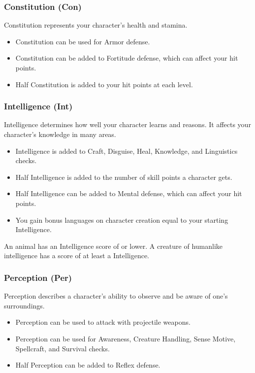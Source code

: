 \subsubsection{Constitution (Con)}\label{Constitution}
Constitution represents your character's health and stamina.
\begin{itemize}
    \item Constitution can be used for Armor defense.
    \item Constitution can be added to Fortitude defense, which can affect your hit points.
    \item Half Constitution is added to your hit points at each level.
\end{itemize}

\subsubsection{Intelligence (Int)}\label{Intelligence}
Intelligence determines how well your character learns and reasons.
It affects your character's knowledge in many areas.

\begin{itemize}
    \item Intelligence is added to Craft, Disguise, Heal, Knowledge, and Linguistics checks.
    \item Half Intelligence is added to the number of skill points a character gets.
    \item Half Intelligence can be added to Mental defense, which can affect your hit points.
    \item You gain bonus languages on character creation equal to your starting Intelligence.
\end{itemize}

\par An animal has an Intelligence score of  or lower.
A creature of humanlike intelligence has a score of at least a  Intelligence.

\subsubsection{Perception (Per)}\label{Perception}
Perception describes a character's ability to observe and be aware of one's surroundings.
\begin{itemize}
    \item Perception can be used to attack with projectile weapons.
    \item Perception can be used for Awareness, Creature Handling, Sense Motive, Spellcraft, and Survival checks.
    \item Half Perception can be added to Reflex defense.
\end{itemize}

